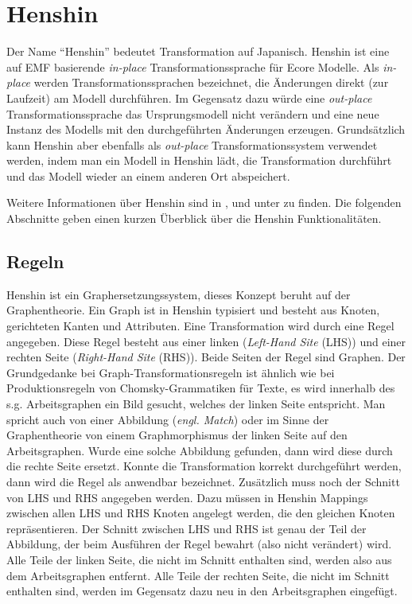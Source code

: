 
\section{Henshin}

Der Name "`Henshin"' bedeutet Transformation auf Japanisch. Henshin ist eine auf EMF
basierende \textit{in-place} Transformationssprache für Ecore Modelle. Als \textit{in-place} werden
Transformationssprachen bezeichnet, die Änderungen direkt (zur Laufzeit) am Modell durchführen. Im
Gegensatz dazu würde eine \textit{out-place} Transformationssprache das Ursprungsmodell nicht
verändern und eine neue Instanz des Modells mit den durchgeführten Änderungen erzeugen.
Grundsätzlich kann Henshin aber ebenfalls als \textit{out-place} Transformationssystem verwendet
werden, indem man ein Modell in Henshin lädt, die Transformation durchführt und das Modell wieder an
einem anderen Ort abspeichert.

Weitere Informationen über Henshin sind in \cite{Arendt2010}, \cite{BES10} und unter
\cite{HENSHIN} zu finden. Die folgenden Abschnitte geben einen kurzen Überblick über die Henshin
Funktionalitäten.

\subsection{Regeln}

Henshin ist ein Graphersetzungssystem, dieses Konzept beruht auf der Graphentheorie. Ein Graph ist
in Henshin typisiert und besteht aus Knoten, gerichteten Kanten und Attributen. Eine Transformation
wird durch eine Regel angegeben. Diese Regel besteht aus einer linken (\textit{Left-Hand Site}
(LHS)) und einer rechten Seite (\textit{Right-Hand Site} (RHS)). Beide Seiten der Regel sind
Graphen. Der Grundgedanke bei Graph-Transformationsregeln ist ähnlich wie bei Produktionsregeln von
Chomsky-Grammatiken für Texte, es wird innerhalb des s.g. Arbeitsgraphen ein Bild gesucht, welches
der linken Seite entspricht. Man spricht auch von einer Abbildung (\textit{engl. Match}) oder im
Sinne der Graphentheorie von einem Graphmorphismus der linken Seite auf den Arbeitsgraphen. Wurde
eine solche Abbildung gefunden, dann wird diese durch die rechte Seite ersetzt.  Konnte die
Transformation korrekt durchgeführt werden, dann wird die Regel als anwendbar bezeichnet.
Zusätzlich muss noch der Schnitt von LHS und RHS angegeben werden. Dazu müssen in Henshin Mappings
zwischen allen LHS und RHS Knoten angelegt werden, die den gleichen Knoten repräsentieren. Der
Schnitt zwischen LHS und RHS ist genau der Teil der Abbildung, der beim Ausführen der Regel bewahrt
(also nicht verändert) wird. Alle Teile der linken Seite, die nicht im Schnitt enthalten sind,
werden also aus dem Arbeitsgraphen entfernt. Alle Teile der rechten Seite, die nicht im Schnitt
enthalten sind, werden im Gegensatz dazu neu in den Arbeitsgraphen eingefügt.

